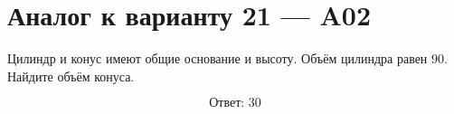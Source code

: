 \documentclass[12pt,a4paper]{article}
\begin{document}
\section*{Аналог к варианту 21 — A02}

Цилиндр и конус имеют общие основание и высоту. Объём цилиндра равен \(90\). Найдите объём конуса.

\begin{center}
\end{center}

\[
\boxed{\text{Ответ: }30}
\]
\end{document}
